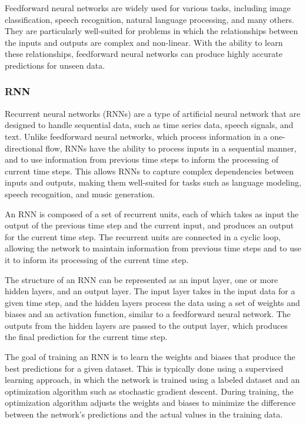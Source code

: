 \documentclass[12pt, a4paper, oneside]{article}
\begin{document}
Feedforward neural networks are widely used for various tasks, including image classification, speech recognition, natural language processing, and many others. They are particularly well-suited for problems in which the relationships between the inputs and outputs are complex and non-linear. With the ability to learn these relationships, feedforward neural networks can produce highly accurate predictions for unseen data.
\subsubsection{RNN}
Recurrent neural networks (RNNs) are a type of artificial neural network that are designed to handle sequential data, such as time series data, speech signals, and text. Unlike feedforward neural networks, which process information in a one-directional flow, RNNs have the ability to process inputs in a sequential manner, and to use information from previous time steps to inform the processing of current time steps. This allows RNNs to capture complex dependencies between inputs and outputs, making them well-suited for tasks such as language modeling, speech recognition, and music generation.

An RNN is composed of a set of recurrent units, each of which takes as input the output of the previous time step and the current input, and produces an output for the current time step. The recurrent units are connected in a cyclic loop, allowing the network to maintain information from previous time steps and to use it to inform its processing of the current time step.

The structure of an RNN can be represented as an input layer, one or more hidden layers, and an output layer. The input layer takes in the input data for a given time step, and the hidden layers process the data using a set of weights and biases and an activation function, similar to a feedforward neural network. The outputs from the hidden layers are passed to the output layer, which produces the final prediction for the current time step.

The goal of training an RNN is to learn the weights and biases that produce the best predictions for a given dataset. This is typically done using a supervised learning approach, in which the network is trained using a labeled dataset and an optimization algorithm such as stochastic gradient descent. During training, the optimization algorithm adjusts the weights and biases to minimize the difference between the network's predictions and the actual values in the training data.
\end{document}
